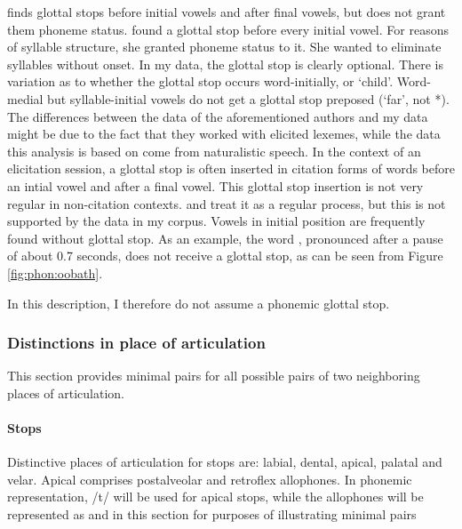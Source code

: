 \citet{Tapovanaye1995} finds glottal stops  before initial vowels and after final vowels, but does not grant them phoneme status.
\citet{Bichsel} found a glottal stop before every initial vowel. For reasons of syllable structure, she granted phoneme status to it. She wanted to eliminate syllables without onset.  In my data, the glottal stop is clearly optional.  There is variation as to whether the glottal stop occurs word-initially,  or  `child'. Word-medial but syllable-initial vowels do not get a glottal stop preposed (`far', not *). The differences between the data of the aforementioned authors and my data might be due to the fact that they worked with elicited lexemes, while the data this analysis is based on come from naturalistic speech. In the context of an elicitation session, a glottal stop is often inserted in citation forms of words before an intial vowel and after a final vowel. This glottal stop insertion is not very regular in non-citation contexts. \citet{Bichsel}{} and \citet{Tapovanaye1995}{} treat it as a regular process, but this is not supported by the data in my corpus.  Vowels in initial position are frequently found without glottal stop. As an example, the word , pronounced after a pause of about 0.7 seconds, does not receive a glottal stop, as can be seen from Figure \ref{fig:phon:oobath}.
 
In this description, I therefore do not assume a phonemic glottal stop. 

\subsubsection{Distinctions in place of articulation}\label{sec:phon:Distinctionsinplaceofarticulation}
This section provides minimal pairs for all possible pairs of two neighboring places of articulation.

\paragraph{Stops}
 Distinctive places of articulation for stops are:  labial, dental, apical, palatal and velar. Apical comprises postalveolar and retroflex allophones. In phonemic representation, /t/ will be used for apical stops, while the allophones will be represented as \phonet{\postalvt,\postalvd} and \phonet{\tz,\dz} in this section for purposes of illustrating minimal pairs\\

